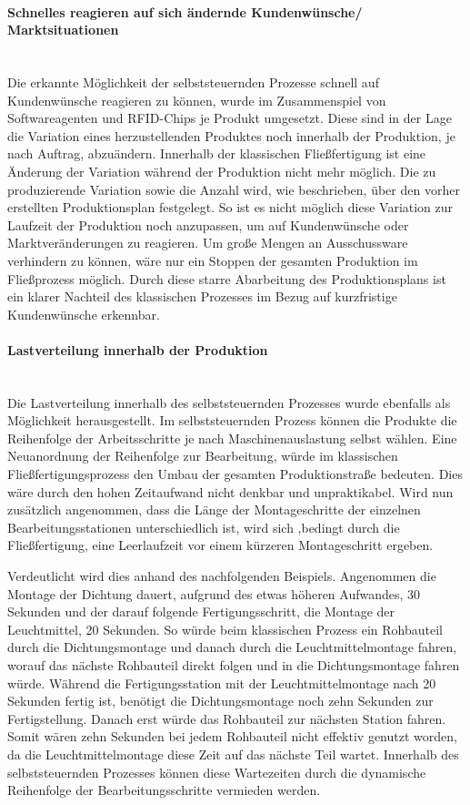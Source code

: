 \paragraph{Schnelles reagieren auf sich ändernde Kundenwünsche/
Marktsituationen} \hfill \\
Die erkannte Möglichkeit der selbststeuernden Prozesse schnell auf Kundenwünsche
reagieren zu können, wurde im Zusammenspiel von Softwareagenten und RFID-Chips
je Produkt umgesetzt. Diese sind in der Lage die Variation eines
herzustellenden Produktes noch innerhalb der Produktion, je nach Auftrag,
abzuändern. Innerhalb der klassischen Fließfertigung ist eine Änderung der
Variation während der Produktion nicht mehr möglich. Die zu produzierende
Variation sowie die Anzahl wird, wie beschrieben, über den vorher erstellten
Produktionsplan festgelegt. So ist es nicht möglich diese Variation zur
Laufzeit der Produktion noch anzupassen, um auf Kundenwünsche oder
Marktveränderungen zu reagieren. Um große Mengen an Ausschussware verhindern zu
können, wäre nur ein Stoppen der gesamten Produktion im Fließprozess möglich.
Durch diese starre Abarbeitung des Produktionsplans ist ein klarer Nachteil des
klassischen Prozesses im Bezug auf kurzfristige Kundenwünsche erkennbar.

\paragraph{Lastverteilung innerhalb der Produktion} \hfill \\
Die Lastverteilung innerhalb des selbststeuernden Prozesses wurde ebenfalls als
Möglichkeit herausgestellt. Im selbststeuernden Prozess können die Produkte die
Reihenfolge der Arbeitsschritte je nach Maschinenauslastung selbst wählen. Eine
Neuanordnung der Reihenfolge zur Bearbeitung, würde im klassischen
Fließfertigungsprozess den Umbau der gesamten Produktionstraße bedeuten. Dies
wäre durch den hohen Zeitaufwand nicht denkbar und unpraktikabel. Wird nun
zusätzlich angenommen, dass die Länge der Montageschritte der einzelnen
Bearbeitungsstationen unterschiedlich ist, wird sich ,bedingt durch die
Fließfertigung, eine Leerlaufzeit vor einem kürzeren Montageschritt ergeben.

Verdeutlicht wird dies anhand des nachfolgenden Beispiels. Angenommen die
Montage der Dichtung dauert, aufgrund des etwas höheren Aufwandes, 30 Sekunden
und der darauf folgende Fertigungsschritt, die Montage der Leuchtmittel, 20
Sekunden. So würde beim klassischen Prozess ein Rohbauteil durch die
Dichtungsmontage und danach durch die Leuchtmittelmontage fahren, worauf das
nächste Rohbauteil direkt folgen und in die Dichtungsmontage fahren würde.
Während die Fertigungsstation mit der Leuchtmittelmontage nach 20 Sekunden
fertig ist, benötigt die Dichtungsmontage noch zehn Sekunden zur
Fertigstellung. Danach erst würde das Rohbauteil zur nächsten Station fahren.
Somit wären zehn Sekunden bei jedem Rohbauteil nicht effektiv genutzt worden,
da die Leuchtmittelmontage diese Zeit auf das nächste Teil wartet.
Innerhalb des selbststeuernden Prozesses können diese Wartezeiten durch die
dynamische Reihenfolge der Bearbeitungsschritte vermieden werden.

